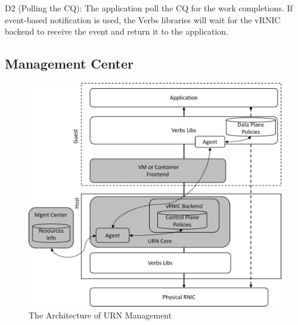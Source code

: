 D2 (Polling the CQ): The application poll the CQ for the work completions. If event-based notification is used, the Verbs libraries will wait for the vRNIC backend to receive the event and return it to the application.

\subsection{Management Center}




\begin{figure}[!ht]
	\centering
	\includegraphics[width=1\linewidth]{images/urn-interface.png}
	\caption{The Architecture of URN Management}
	\label{fig:route-config}
\end{figure}

